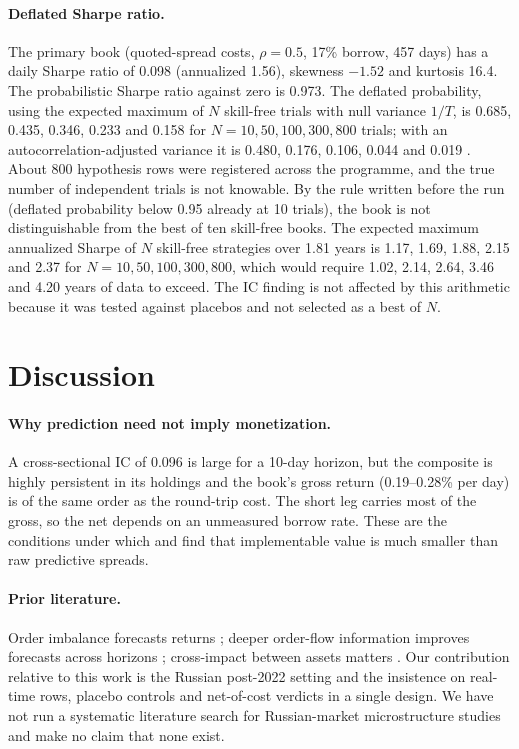\documentclass[11pt]{article}
\begin{document}
\paragraph{Deflated Sharpe ratio.} The primary book (quoted-spread costs, $\rho=0.5$, 17\% borrow, 457 days) has a daily Sharpe ratio of 0.098 (annualized 1.56), skewness $-1.52$ and kurtosis 16.4. The probabilistic Sharpe ratio against zero is 0.973. The deflated probability, using the expected maximum of $N$ skill-free trials with null variance $1/T$, is 0.685, 0.435, 0.346, 0.233 and 0.158 for $N=10,50,100,300,800$ trials; with an autocorrelation-adjusted variance it is 0.480, 0.176, 0.106, 0.044 and 0.019 \citep{bailey2014deflated}. About 800 hypothesis rows were registered across the programme, and the true number of independent trials is not knowable. By the rule written before the run (deflated probability below 0.95 already at 10 trials), the book is not distinguishable from the best of ten skill-free books. The expected maximum annualized Sharpe of $N$ skill-free strategies over 1.81 years is 1.17, 1.69, 1.88, 2.15 and 2.37 for $N=10,50,100,300,800$, which would require 1.02, 2.14, 2.64, 3.46 and 4.20 years of data to exceed. The IC finding is not affected by this arithmetic because it was tested against placebos and not selected as a best of $N$.

\section{Discussion}

\paragraph{Why prediction need not imply monetization.} A cross-sectional IC of 0.096 is large for a 10-day horizon, but the composite is highly persistent in its holdings and the book's gross return (0.19--0.28\% per day) is of the same order as the round-trip cost. The short leg carries most of the gross, so the net depends on an unmeasured borrow rate. These are the conditions under which \citet{muravyev2025anomalies} and \citet{jensen2026implementable} find that implementable value is much smaller than raw predictive spreads.

\paragraph{Prior literature.} Order imbalance forecasts returns \citep{chordia2004order}; deeper order-flow information improves forecasts across horizons \citep{kolm2023deep}; cross-impact between assets matters \citep{cont2023crossimpact}. Our contribution relative to this work is the Russian post-2022 setting and the insistence on real-time rows, placebo controls and net-of-cost verdicts in a single design. We have not run a systematic literature search for Russian-market microstructure studies and make no claim that none exist.
\end{document}
